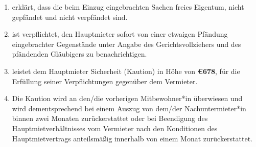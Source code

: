 \documentclass{scrreprt}[12pt,a4paper,twoside,duplex]
\newcommand{\mietKaution}{\euro{678}}
\begin{document}
\begin{contract}
\label{clause:kaution}
\begin{enumerate}
	\item {} erklärt, dass die beim Einzug eingebrachten Sachen  freies Eigentum, nicht gepfändet und nicht verpfändet sind.
	
	\item {} ist verpflichtet, den Hauptmieter sofort von einer etwaigen Pfändung eingebrachter Gegenstände unter Angabe des Gerichtsvollziehers und des pfändenden Gläubigers zu benachrichtigen.
	
	\item {} leistet dem Hauptmieter Sicherheit (Kaution) in Höhe von \textbf{\mietKaution}, für die Erfüllung seiner Verpflichtungen gegenüber dem Vermieter.
	
	\item Die Kaution wird an den/die vorherigen Mitbewohner*in überwiesen und wird dementsprechend bei einem Auszug von dem/der Nachuntermieter*in binnen zwei Monaten zurückerstattet oder bei Beendigung des Hauptmietverhältnisses vom Vermieter nach den Konditionen des Hauptmietvertrags anteilsmä{\ss}ig innerhalb von einem Monat zurückerstattet.
\end{enumerate}
\end{contract}
\end{document}
